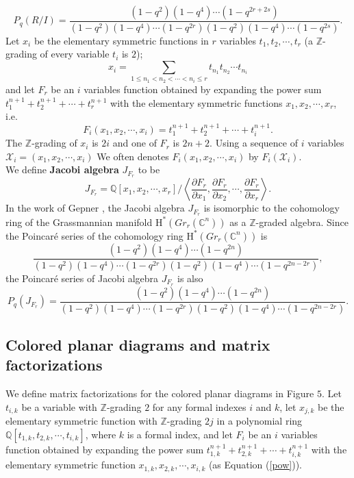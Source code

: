 \documentclass[10pt]{amsart}
\theoremstyle{break}
\begin{document}
\begin{equation}
\label{poincare2}P_q(R/I)=\frac{(1-q^2)(1-q^4)\cdots (1-q^{2r+2s})}{(1-q^2)(1-q^4)\cdots (1-q^{2r})(1-q^2)(1-q^4)\cdots (1-q^{2s})}.
\end{equation}
\indent
Let $x_i$ be the elementary symmetric functions in $r$ variables $t_1,t_2,\cdots ,t_r$ (a ${{\mathbb{Z}}}$-grading of every variable $t_i$ is $2$);
\begin{equation}
x_i = \sum_{1\leq n_1 < n_2 < \cdots < n_i \leq r} t_{n_1}t_{n_2}\cdots t_{n_i}
\end{equation}
and let $F_r$ be an $i$ variables function obtained by expanding the power sum $t_1^{n+1}+t_2^{n+1}+\cdots +t_r^{n+1}$ with 
the elementary symmetric functions $x_1,x_2,\cdots ,x_r$, i.e.
\begin{equation}
\label{pow}F_i(x_{1} ,x_{2} ,\cdots ,x_{i})=t_{1}^{n+1} + t_{2}^{n+1} + \cdots + t_{i}^{n+1}.
\end{equation}
The ${{\mathbb{Z}}}$-grading of $x_i$ is $2i$ and one of $F_r$ is $2n+2$.
Using a sequence of $i$ variables $\mathcal{X}_{i}=(x_{1} ,x_{2} ,\cdots ,x_{i})$ We often denotes $F_i(x_{1} ,x_{2} ,\cdots ,x_{i})$ by $F_i(\mathcal{X}_{i})$.\\
\indent
We define {\bf Jacobi algebra} $J_{F_r}$ to be
$$
J_{F_r}={{\mathbb{Q}}} [x_1,x_2,\cdots ,x_r] / \left< \frac{\partial F_r}{\partial x_1}, \frac{\partial F_r}{\partial x_2},\cdots ,\frac{\partial F_r}{\partial x_r} \right>.
$$ 
\indent
In the work of Gepner \cite{Gepner}, the Jacobi algebra $J_{F_r}$ is isomorphic to the cohomology ring of the Grassmannian manifold ${{\mathrm{H}}}^* (Gr_r ({{\mathbb{C}}}^n))$ as a ${{\mathbb{Z}}}$-graded algebra. 
Since the Poincar\'e series of the cohomology ring ${{\mathrm{H}}}^* (Gr_r ({{\mathbb{C}}}^n))$ is
$$
\frac{(1-q^2)(1-q^4)\cdots (1-q^{2n})}{(1-q^2)(1-q^4)\cdots (1-q^{2r})(1-q^2)(1-q^4)\cdots (1-q^{2n-2r})},
$$
the Poincar\'e series of Jacobi algebra $J_{F_r}$ is also
\begin{equation}
\label{Jacobi} P_q(J_{F_r})=\frac{(1-q^2)(1-q^4)\cdots (1-q^{2n})}{(1-q^2)(1-q^4)\cdots (1-q^{2r})(1-q^2)(1-q^4)\cdots (1-q^{2n-2r})}.
\end{equation}
\subsection{Colored planar diagrams and matrix factorizations}\label{sec4.2}
We define matrix factorizations for the colored planar diagrams in Figure $5$.
Let $t_{i,k}$ be a variable with ${{\mathbb{Z}}}$-grading $2$ for any formal indexes $i$ and $k$, let $x_{j,k}$ be the elementary symmetric function with ${{\mathbb{Z}}}$-grading $2j$ in a polynomial ring ${{\mathbb{Q}}} [t_{1,k},t_{2,k},\cdots ,t_{i,k}]$, where $k$ is a formal index, 
and let $F_i$ be an $i$ variables function obtained by expanding the power sum $t_{1,k}^{n+1} + t_{2,k}^{n+1} + \cdots + t_{i,k}^{n+1}$ 
with the elementary symmetric function $x_{1,k} ,x_{2,k} ,\cdots ,x_{i,k}$ (as Equation (\ref{pow})).
\end{document}
